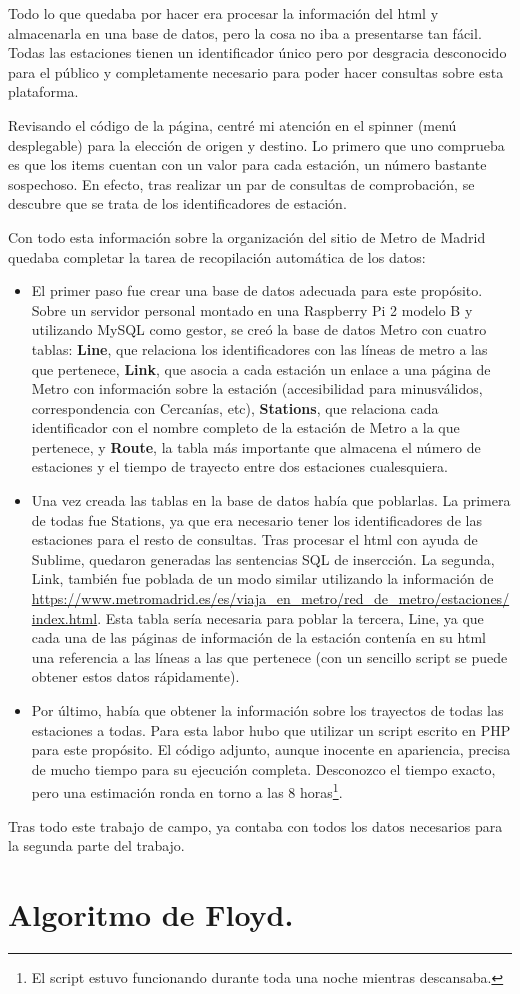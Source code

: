 \documentclass[spanish, a4paper, 12pt] {article}
\begin{document}
Todo lo que quedaba por hacer era procesar la información del html y almacenarla en una base de datos, pero la cosa no iba a presentarse tan fácil. Todas las estaciones tienen un identificador único pero por desgracia desconocido para el público y completamente necesario para poder hacer consultas sobre esta plataforma.\\ \par
Revisando el código de la página, centré mi atención en el spinner (menú desplegable) para la elección de origen y destino. Lo primero que uno comprueba es que los items cuentan con un valor para cada estación, un número bastante sospechoso. En efecto, tras realizar un par de consultas de comprobación, se descubre que se trata de los identificadores de estación.\\ \par
Con todo esta información sobre la organización del sitio de Metro de Madrid quedaba completar la tarea de recopilación automática de los datos:
\begin{itemize}
\item {
El primer paso fue crear una base de datos adecuada para este propósito. Sobre un servidor personal montado en una Raspberry Pi 2 modelo B y utilizando MySQL como gestor, se creó la base de datos Metro con cuatro tablas: {\bf Line}, que relaciona los identificadores con las líneas de metro a las que pertenece, {\bf Link}, que asocia a cada estación un enlace a una página de Metro con información sobre la estación (accesibilidad para minusválidos, correspondencia con Cercanías, etc), {\bf Stations}, que relaciona cada identificador con el nombre completo de la estación de Metro a la que pertenece, y {\bf Route}, la tabla más importante que almacena el número de estaciones y el tiempo de trayecto entre dos estaciones cualesquiera.
}
\item {
Una vez creada las tablas en la base de datos había que poblarlas. La primera de todas fue Stations, ya que era necesario tener los identificadores de las estaciones para el resto de consultas. Tras procesar el html con ayuda de Sublime, quedaron generadas las sentencias SQL de insercción. La segunda, Link, también fue poblada de un modo similar utilizando la información de \url{https://www.metromadrid.es/es/viaja_en_metro/red_de_metro/estaciones/index.html}. Esta tabla sería necesaria para poblar la tercera, Line, ya que cada una de las páginas de información de la estación contenía en su html una referencia a las líneas a las que pertenece (con un sencillo script se puede obtener estos datos rápidamente).
}
\item {
Por último, había que obtener la información sobre los trayectos de todas las estaciones a todas. Para esta labor hubo que utilizar un script escrito en PHP para este propósito. El código adjunto, aunque inocente en apariencia, precisa de mucho tiempo para su ejecución completa. Desconozco el tiempo exacto, pero una estimación ronda en torno a las 8 horas\footnote{El script estuvo funcionando durante toda una noche mientras descansaba.}.
}
\end{itemize}
Tras todo este trabajo de campo, ya contaba con todos los datos necesarios para la segunda parte del trabajo.
\section{Algoritmo de Floyd.}
\end{document}

